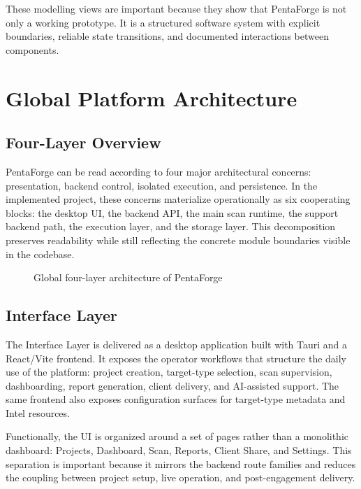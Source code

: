 \documentclass[12pt,a4paper]{report}
\begin{document}
These modelling views are important because they show that PentaForge is not only a
working prototype. It is a structured software system with explicit boundaries,
reliable state transitions, and documented interactions between components.

\newpage
\section{Global Platform Architecture}

\subsection{Four-Layer Overview}

PentaForge can be read according to four major architectural concerns: presentation,
backend control, isolated execution, and persistence. In the implemented project,
these concerns materialize operationally as six cooperating blocks: the desktop UI,
the backend API, the main scan runtime, the support backend path, the execution
layer, and the storage layer. This decomposition preserves readability while still
reflecting the concrete module boundaries visible in the codebase.

\begin{figure}[H]
    \centering
    \caption{Global four-layer architecture of PentaForge}
    \label{fig:global_arch}
\end{figure}

\subsection{Interface Layer}

The Interface Layer is delivered as a desktop application built with Tauri and a
React/Vite frontend. It exposes the operator workflows that structure the daily use
of the platform: project creation, target-type selection, scan supervision,
dashboarding, report generation, client delivery, and AI-assisted support. The same
frontend also exposes configuration surfaces for target-type metadata and Intel
resources.

Functionally, the UI is organized around a set of pages rather than a monolithic
dashboard: Projects, Dashboard, Scan, Reports, Client Share, and Settings. This
separation is important because it mirrors the backend route families and reduces
the coupling between project setup, live operation, and post-engagement delivery.
\end{document}
